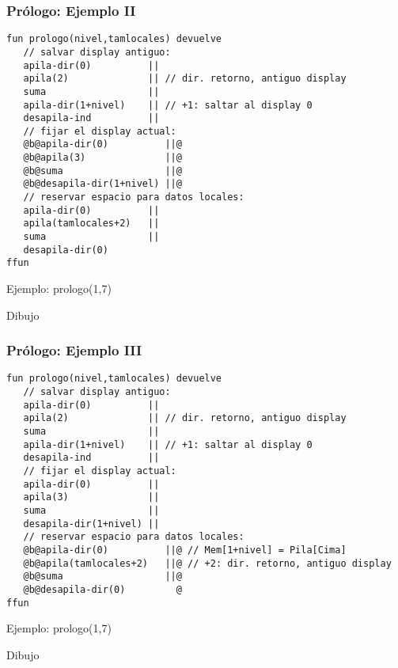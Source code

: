\documentclass[hyperref={pdfpagelabels=false},tree-dvips]{beamer}
\begin{document}
\begin{frame}[fragile]
\frametitle{Prólogo: Ejemplo II}

\begin{lstlisting}[style=codigoMP,basicstyle=\tiny\ttfamily]
fun prologo(nivel,tamlocales) devuelve
   // salvar display antiguo:
   apila-dir(0)          ||
   apila(2)              || // dir. retorno, antiguo display
   suma                  ||
   apila-dir(1+nivel)    || // +1: saltar al display 0
   desapila-ind          ||
   // fijar el display actual:
   @b@apila-dir(0)          ||@
   @b@apila(3)              ||@
   @b@suma                  ||@
   @b@desapila-dir(1+nivel) ||@
   // reservar espacio para datos locales:
   apila-dir(0)          ||
   apila(tamlocales+2)   ||
   suma                  ||
   desapila-dir(0)
ffun
\end{lstlisting}

Ejemplo: prologo(1,7)

Dibujo

\end{frame}
\begin{frame}[fragile]
\frametitle{Prólogo: Ejemplo III}

\begin{lstlisting}[style=codigoMP,basicstyle=\tiny\ttfamily]
fun prologo(nivel,tamlocales) devuelve
   // salvar display antiguo:
   apila-dir(0)          ||
   apila(2)              || // dir. retorno, antiguo display
   suma                  ||
   apila-dir(1+nivel)    || // +1: saltar al display 0
   desapila-ind          ||
   // fijar el display actual:
   apila-dir(0)          ||
   apila(3)              ||
   suma                  ||
   desapila-dir(1+nivel) ||
   // reservar espacio para datos locales:
   @b@apila-dir(0)          ||@ // Mem[1+nivel] = Pila[Cima]
   @b@apila(tamlocales+2)   ||@ // +2: dir. retorno, antiguo display
   @b@suma                  ||@
   @b@desapila-dir(0)         @
ffun
\end{lstlisting}

Ejemplo: prologo(1,7)

Dibujo

\end{frame}
\end{document}
